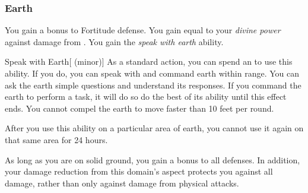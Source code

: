         \subsubsection{Earth}
             You gain a  bonus to Fortitude defense.
             You gain  equal to your \textit{divine power} against damage from .
             You gain the \textit{speak with earth} ability.
            \begin{ability}{Speak with Earth}[ (minor)]
                As a standard action, you can spend an  to use this ability.
                If you do, you can speak with and command earth within \rnglong range.
                You can ask the earth simple questions and understand its responses.
                If you command the earth to perform a task, it will do so do the best of its ability until this effect ends.
                You cannot compel the earth to move faster than 10 feet per round.

                After you use this ability on a particular area of earth, you cannot use it again on that same area for 24 hours.
            \end{ability}
             As long as you are on solid ground, you gain a  bonus to all defenses.
            In addition, your damage reduction from this domain's aspect protects you against all damage, rather than only against damage from physical attacks.


